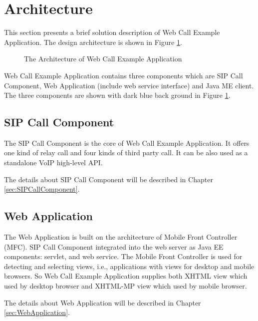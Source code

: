 \section{Architecture}
\label{sec:ApplicationOverview:ArchitectureOverview}

This section presents a brief solution description of Web Call Example Application. The design architecture is shown in Figure \ref{fig:ArchitectureOfWebCallExampleApplication}.

\begin{figure}[!hbtp]
\centering
{}
\caption{The Architecture of Web Call Example Application}
\label{fig:ArchitectureOfWebCallExampleApplication}
\end{figure}

Web Call Example Application contains three components which are SIP Call Component, Web Application (include web service interface) and Java ME client. The three components are shown with dark blue back ground in Figure \ref{fig:ArchitectureOfWebCallExampleApplication}.

\subsection{SIP Call Component}

The SIP Call Component is the core of Web Call Example Application. It offers one kind of relay call and four kinds of third party call. It can be also used as a standalone VoIP high-level API. 

The details about SIP Call Component will be described in Chapter \ref{sec:SIPCallComponent}.

\subsection{Web Application}

The Web Application is built on the architecture of Mobile Front Controller (MFC). SIP Call Component integrated into the web server as Java EE components: servlet, and web service. The Mobile Front Controller is used for detecting and selecting views, i.e., applications with views for desktop and mobile browsers. So Web Call Example Application supplies both XHTML view which used by desktop browser and XHTML-MP view which used by mobile browser. 

The details about Web Application will be described in Chapter \ref{sec:WebApplication}.

